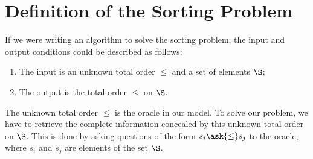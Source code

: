\section{Definition of the Sorting Problem}
\label{tree:sorting:def}

If we were writing an algorithm to solve the sorting problem, the input and output
conditions could be described as follows:

\begin{enumerate}
\item The input is an unknown total order \(\le\) and a set of elements \(\S\);
\item The output is the total order \(\le\) on \(\S\).
\end{enumerate}

The unknown total order \(\le\) is the oracle in our model. To solve our
problem, we have to retrieve the complete information concealed by this
unknown total order on \(\S\). This is done by asking questions of the
form \(s_i \ask{\le} s_j\) to the oracle, where \(s_i\) and \(s_j\) are
elements of the set \(\S\).

